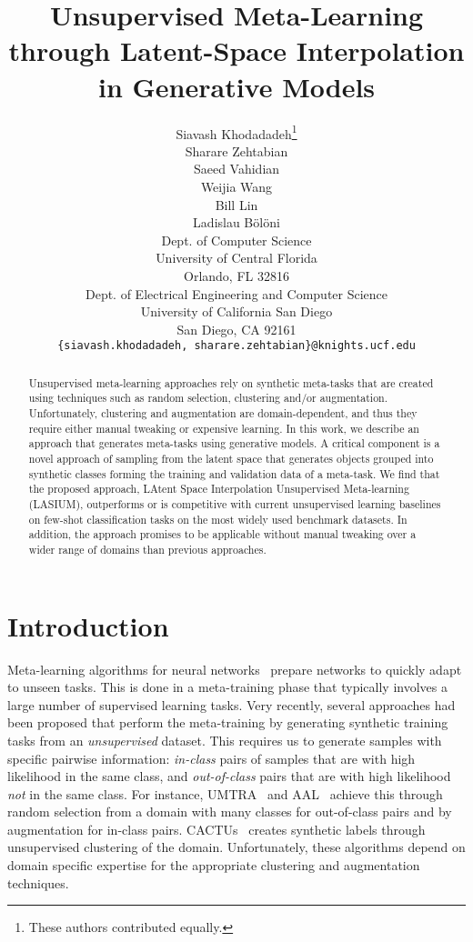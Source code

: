 \documentclass{article}
\title{Unsupervised Meta-Learning through Latent-Space Interpolation in Generative Models}
\author{
  Siavash Khodadadeh\thanks{These authors contributed equally.}\\
  \And
  Sharare Zehtabian\footnotemark[1]\\
  \And
  Saeed Vahidian\\
  \And
  Weijia Wang\\
  \And
  Bill Lin\\
  \And
  Ladislau B{\"o}l{\"o}ni\\
  \AND
  \textnormal{
  \small{ Dept. of Computer Science}
  }
  \\
  \small{University of Central Florida} \\
  \small{Orlando, FL 32816}\\
  \And 
  \textnormal{
  \small{   Dept. of Electrical Engineering and Computer Science}}\\
  \small{University of California San Diego} \\
  \small{San Diego, CA 92161} \\
  \And
  \texttt{\{siavash.khodadadeh, sharare.zehtabian\}@knights.ucf.edu}\\
}
\begin{document}
\maketitle

\begin{abstract}








Unsupervised meta-learning approaches rely on synthetic meta-tasks that are created using techniques such as random selection, clustering and/or augmentation. Unfortunately, clustering and augmentation are domain-dependent, and thus they require either manual tweaking or expensive learning. In this work, we describe an approach that generates meta-tasks using generative models. A critical component is a novel approach of sampling from the latent space that generates objects grouped into synthetic classes forming the training and validation data of a meta-task. We find that the proposed approach, LAtent Space Interpolation Unsupervised Meta-learning (LASIUM), outperforms or is competitive with current unsupervised learning baselines on few-shot classification tasks on the most widely used benchmark datasets. In addition, the approach promises to be applicable without manual tweaking over a wider range of domains than previous approaches. 





\end{abstract}




\section{Introduction}








Meta-learning algorithms for neural networks~\cite{mishra2017simple, finn2017model, snell2017prototypical} prepare networks to quickly adapt to unseen tasks. This is done in a meta-training phase that typically involves a large number of supervised learning tasks. Very recently, several approaches had been proposed that perform the meta-training by generating synthetic training tasks from an {\em unsupervised} dataset. This requires us to generate samples with specific pairwise information: {\em in-class} pairs of samples that are with high likelihood in the same class, and {\em out-of-class} pairs that are with high likelihood {\em not} in the same class. For instance, UMTRA~\cite{khodadadeh2019unsupervised} and AAL~\cite{AAL2019} achieve this through random selection from a domain with many classes for out-of-class pairs and by augmentation for in-class pairs. CACTUs~\cite{hsu2018unsupervised} creates synthetic labels through unsupervised clustering of the domain. Unfortunately, these algorithms depend on domain specific expertise for the appropriate clustering and augmentation techniques. 
\end{document}
